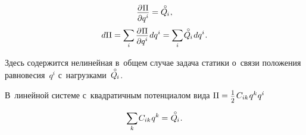 \begin{otherlanguage}{russian}
\nopagebreak\vspace{-0.1em}\begin{equation}\label{staticequilibriumwithpotentialenergy}
\scalebox{0.96}{$ \displaystyle \frac{\raisemath{-0.15em}{\partial \hspace{.1ex} \potential}}{\raisemath{-0.1em}{\partial q^i}} $} = \mathcircabove{Q}_{\hspace{-0.1ex}i}
\hspace{.1ex},
\end{equation}
\nopagebreak\vspace{.1em}\begin{equation*}
d\potential = \scalebox{0.95}[1]{$\displaystyle \sum_{\smash{i}}$} \hspace{.32ex}
\scalebox{0.96}{$ \displaystyle \frac{\raisemath{-0.15em}{\partial \hspace{.1ex} \potential}}{\raisemath{-0.1em}{\partial q^i}} $} \hspace{.2ex} dq^i
= \scalebox{0.95}[1]{$\displaystyle \sum_{\smash{i}}$} \hspace{.2ex} \mathcircabove{Q}_{\hspace{-0.1ex}i} \hspace{.2ex} dq^i
\hspace{.1ex} .
\end{equation*}

\vspace{-0.5em}\noindent
Здесь содержится нелинейная в~общем случае задача статики о~связи положения равновесия~$q^i$ с~нагрузками~${\mathcircabove{Q}_{\hspace{-0.1ex}i}}$.

В~линейной системе с~квадратичным потенциалом вида ${\potential = \smalldisplaystyleonehalf \hspace{.2ex} C_{ik} \hspace{.15ex} q^{k} \hspace{.1ex} q^{i}}$

\nopagebreak\vspace{-1.25em}\begin{equation}\label{staticsoflineardiscretesystem}
\scalebox{0.95}[1]{$\displaystyle \sum_{\smash{k}}$} \hspace{.2ex} C_{ik} \hspace{.12ex} q^k \hspace{-0.1ex}
= \hspace{.1ex} \mathcircabove{Q}_{\hspace{-0.1ex}i} \hspace{.1ex} .
\vspace{-0.1em}\end{equation}


\end{otherlanguage}
